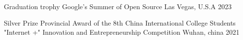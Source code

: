 



\begin{cvhonors}

  \cvhonor
    {Graduation trophy} %
    {Google's Summer of Open Source} %
    {Las Vegas, U.S.A} %
    {2023} %

\end{cvhonors}




\begin{cvhonors}

  \cvhonor
    {Silver Prize} %
    {Provincial Award of the 8th China International College Students "Internet +" Innovation and Entrepreneurship Competition} %
    {Wuhan, china} %
    {2021} %

\end{cvhonors}
